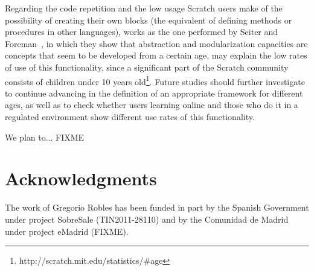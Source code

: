 \documentclass[conference]{format/IEEEtran}
\begin{document}
Regarding the code repetition and the low usage Scratch users make of the possibility of creating their own blocks (the equivalent of defining methods or procedures in other languages), works as the one performed by Seiter and Foreman~\cite {seiter2013modeling}, in which they show that abstraction and modularization capacities are concepts that seem to be developed from a certain age, may explain the low rates of use of this functionality, since a significant part of the Scratch community consists of children under 10 years old\footnote{http://scratch.mit.edu/statistics/\#age}. Future studies should further investigate to continue advancing in the definition of an appropriate framework for different ages, as well as to check whether users learning online and those who do it in a regulated environment show different use rates of this functionality.

We plan to... FIXME

\section*{Acknowledgments}

The work of Gregorio Robles has
been funded in part by the Spanish Government under project 
SobreSale (TIN2011-28110) and by the Comunidad de Madrid 
under project eMadrid (FIXME). 



\end{document}
